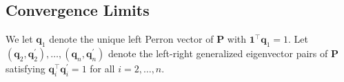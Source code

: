 \documentclass[a4paper, 11pt]{article}
\newcommand{\R}{\mathbb{R}}
\newcommand{\1}{\mathbf{1}}
\newcommand{\Jb}{\mathbf{J}}
\newcommand{\Qb}{\mathbf{Q}}
\newcommand{\Pb}{\mathbf{P}}
\newcommand{\qb}{\mathbf{q}}
\newcommand{\mG}{\mathrm{G}}
\begin{document}
\subsection{Convergence Limits}
We let
$\qb_1$ denote the unique left Perron vector of $\Pb$ with $\1^\top\qb_1=1$. Let $(\qb_2,\qb_2^\prime),\dots,(\qb_n,\qb_n^\prime)$ denote the left-right generalized eigenvector pairs of $\Pb$ satisfying $\qb_i^\top\qb_i^\prime=1$ for all $i=2,\dots,n$.

\medskip
\end{document}
